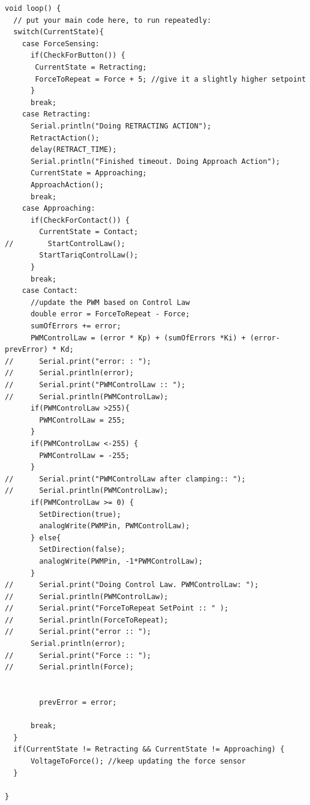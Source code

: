 \documentclass[letterpaper, 10 pt, conference]{ieeeconf}  %
\begin{document}
\begin{lstlisting}
void loop() {
  // put your main code here, to run repeatedly:
  switch(CurrentState){
    case ForceSensing:
      if(CheckForButton()) {
       CurrentState = Retracting;
       ForceToRepeat = Force + 5; //give it a slightly higher setpoint
      }
      break;
    case Retracting:
      Serial.println("Doing RETRACTING ACTION");
      RetractAction();
      delay(RETRACT_TIME);
      Serial.println("Finished timeout. Doing Approach Action");
      CurrentState = Approaching;
      ApproachAction();
      break;
    case Approaching:
      if(CheckForContact()) {
        CurrentState = Contact;
//        StartControlLaw();
        StartTariqControlLaw();
      }
      break;
    case Contact:
      //update the PWM based on Control Law
      double error = ForceToRepeat - Force;
      sumOfErrors += error;
      PWMControlLaw = (error * Kp) + (sumOfErrors *Ki) + (error-prevError) * Kd;
//      Serial.print("error: : ");
//      Serial.println(error);
//      Serial.print("PWMControlLaw :: ");
//      Serial.println(PWMControlLaw);
      if(PWMControlLaw >255){
        PWMControlLaw = 255;
      }
      if(PWMControlLaw <-255) {
        PWMControlLaw = -255;
      }
//      Serial.print("PWMControlLaw after clamping:: ");
//      Serial.println(PWMControlLaw);
      if(PWMControlLaw >= 0) {
        SetDirection(true);
        analogWrite(PWMPin, PWMControlLaw);
      } else{
        SetDirection(false);
        analogWrite(PWMPin, -1*PWMControlLaw);
      }
//      Serial.print("Doing Control Law. PWMControlLaw: ");
//      Serial.println(PWMControlLaw);
//      Serial.print("ForceToRepeat SetPoint :: " );
//      Serial.println(ForceToRepeat);
//      Serial.print("error :: ");
      Serial.println(error);
//      Serial.print("Force :: ");
//      Serial.println(Force);


        prevError = error;

      break;
  }
  if(CurrentState != Retracting && CurrentState != Approaching) {
      VoltageToForce(); //keep updating the force sensor
  }

}
\end{lstlisting}


% 
%  
\end{document}
